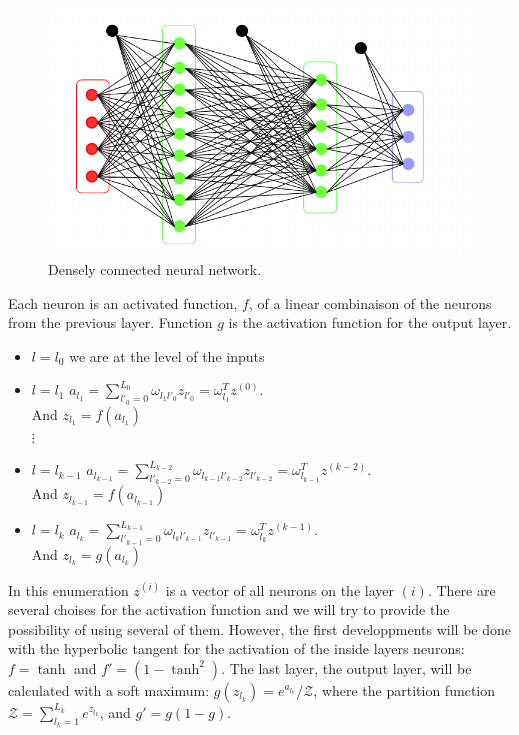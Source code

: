 \documentclass[final, paper=letter,5p,times,twocolumn]{elsarticle}
\begin{document}
\begin{figure}[htbp]
   \begin{center}
      \includegraphics[scale=0.3, angle=0]{images/densely_connected_nn.png}
   \end{center}
   \caption{Densely connected neural network.}
  \label{fig:Densely_connected_neural_network} 
\end{figure}




Each neuron is an activated function, $f$, of a linear combinaison of the neurons from the previous layer. Function $g$ is the activation function for the output layer.

\begin{itemize}
    \item $l = l_{0}$ we are at the level of the inputs
    \item $l = l_{1}$ $a_{l_{1}} = \sum_{l'_{0} = 0}^{L_{0}} \omega_{l_{1}l'_{0}} z_{l'_{0}} = \omega_{l_{1}}^{T} z^{(0)}$. \\ And $z_{l_{1}} = f(a_{l_{1}})$ \\
     $\vdots$
    \item $l = l_{k-1}$ $a_{l_{k-1}} = \sum_{l'_{k-2} = 0}^{L_{k-2}} \omega_{l_{k-1}l'_{k-2}} z_{l'_{k-2}} = \omega_{l_{k-1}}^{T} z^{(k-2)}$. \\ And $z_{l_{k-1}} = f(a_{l_{k-1}})$
    \item $l = l_{k}$ $a_{l_{k}} = \sum_{l'_{k-1} = 0}^{L_{k-1}} \omega_{l_{k}l'_{k-1}} z_{l'_{k-1}} = \omega_{l_{k}}^{T} z^{(k-1)}$. \\ And $z_{l_{k}} = g(a_{l_{k}})$
\end{itemize}

In this enumeration $z^{(i)}$ is a vector of all neurons on the layer $(i)$. There are several choises for the activation function and we will try to provide the possibility of using several of them. However, the first developpments will be done with the hyperbolic tangent for the activation of the inside layers neurons: $f = \tanh$ and $f' = (1 - \tanh^{2})$. The last layer, the output layer, will be calculated with a soft maximum: $g(z_{l_{k}}) = e^{a_{l_{k}}} / \mathcal{Z}$, where the partition function $\mathcal{Z} = \sum_{l_{k} = 1}^{L_{k}} e^{z_{l_{k}}}$, and $g' = g(1 - g)$.
  
\end{document}
